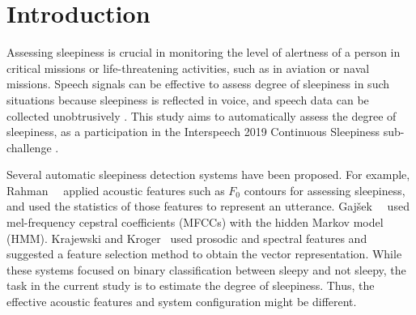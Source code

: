 \section{Introduction}
\label{sec:introduction}
Assessing sleepiness is crucial in monitoring the level of alertness of a person in critical missions or life-threatening activities, such as in aviation or naval missions. 
Speech signals can be effective to assess degree of sleepiness in such situations because sleepiness is reflected in voice, and speech data can be collected unobtrusively \cite{de2019speech}.
This study aims to automatically assess the degree of sleepiness, as a participation in the Interspeech 2019 Continuous Sleepiness sub-challenge \cite{schullerinterspeech}.


Several automatic sleepiness detection systems have been proposed. For example, Rahman~\etal~\cite{rahman2011detecting} applied acoustic features such as $F_0$ contours for assessing sleepiness, and used the statistics of those features to represent an utterance. Gaj\v{s}ek~\etal~\cite{gajvsek2011university} used mel-frequency cepstral coefficients (MFCCs) with the hidden Markov model (HMM). Krajewski and Kroger~\cite{Krajewski2007} used prosodic and spectral features and suggested a feature selection method to obtain the vector representation.
While these systems focused on binary classification between sleepy and not sleepy, the task in the current study is to estimate the degree of sleepiness. Thus, the effective acoustic features and system configuration might be different.


